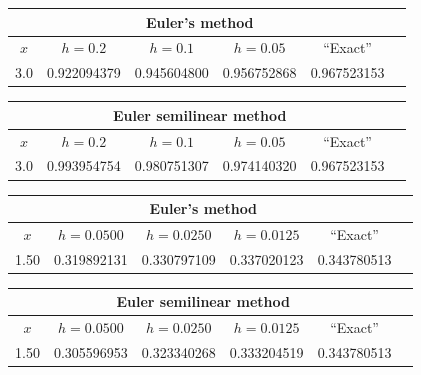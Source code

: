 \bigskip
{}
{\small
\begin{tabular}{|c|r|r|r|r|r|}
\hline
\multicolumn{5}{|c|}{Euler's method}\\\hline
\multicolumn{1}{|c|}{$x$}&
\multicolumn{1}{|c|}{$h=0.2$}&
\multicolumn{1}{|c|}{$h=0.1$}&
\multicolumn{1}{|c|}{$h=0.05$}&
\multicolumn{1}{|c|}{``Exact''}\\ \hline
3.0 & 0.922094379 & 0.945604800 & 0.956752868 & 0.967523153 \\
\hline
\end{tabular}}

\bigskip

\hspace{.75in}
{\small
\begin{tabular}{|c|r|r|r|r|r|}
\hline
\multicolumn{5}{|c|}{Euler semilinear method}\\\hline
\multicolumn{1}{|c|}{$x$}&
\multicolumn{1}{|c|}{$h=0.2$}&
\multicolumn{1}{|c|}{$h=0.1$}&
\multicolumn{1}{|c|}{$h=0.05$}&
\multicolumn{1}{|c|}{``Exact''}\\ \hline
3.0 & 0.993954754 & 0.980751307 & 0.974140320 & 0.967523153 \\
\hline
\end{tabular}}

\bigskip

\small{
\begin{tabular}{|c|r|r|r|r|r|}
\hline
\multicolumn{5}{|c|}{Euler's method}\\\hline
\multicolumn{1}{|c|}{$x$}&
\multicolumn{1}{|c|}{$h=0.0500$}&
\multicolumn{1}{|c|}{$h=0.0250$}&
\multicolumn{1}{|c|}{$h=0.0125$}&
\multicolumn{1}{|c|}{``Exact''}\\ \hline
1.50 & 0.319892131 & 0.330797109 & 0.337020123 & 0.343780513 \\
\hline
\end{tabular}}
\bigskip

\hspace{.75in}
{\small
\begin{tabular}{|c|r|r|r|r|r|}
\hline
\multicolumn{5}{|c|}{Euler semilinear method}\\\hline
\multicolumn{1}{|c|}{$x$}&
\multicolumn{1}{|c|}{$h=0.0500$}&
\multicolumn{1}{|c|}{$h=0.0250$}&
\multicolumn{1}{|c|}{$h=0.0125$}&
\multicolumn{1}{|c|}{``Exact''}\\ \hline
1.50 & 0.305596953 & 0.323340268 & 0.333204519 & 0.343780513 \\
\hline
\end{tabular}}

